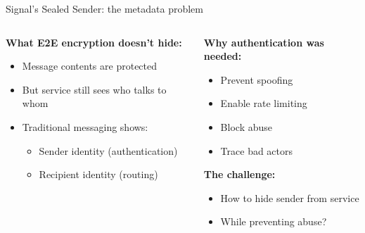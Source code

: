 \documentclass[aspectratio=169, lualatex, handout]{beamer}
\begin{document}
\begin{frame}{Signal's Sealed Sender: the metadata problem}
	\begin{columns}
		\begin{column}{0.5\textwidth}
			\textbf{What E2E encryption doesn't hide:}
			\begin{itemize}
				\item Message contents are protected
				\item But service still sees who talks to whom
				\item Traditional messaging shows:
				      \begin{itemize}
					      \item Sender identity (authentication)
					      \item Recipient identity (routing)
				      \end{itemize}
			\end{itemize}
		\end{column}
		\begin{column}{0.5\textwidth}
			\textbf{Why authentication was needed:}
			\begin{itemize}
				\item Prevent spoofing
				\item Enable rate limiting
				\item Block abuse
				\item Trace bad actors
			\end{itemize}
			\textbf{The challenge:}
			\begin{itemize}
				\item How to hide sender from service
				\item While preventing abuse?
			\end{itemize}
		\end{column}
	\end{columns}
\end{frame}
\end{document}
